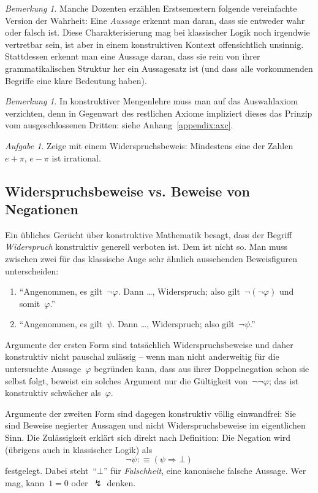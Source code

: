 \documentclass[a4paper,ngerman,12pt]{scrartcl}
\theoremstyle{definition}
\theoremstyle{plain}
\theoremstyle{remark}
\newtheorem{bem}[defn]{Bemerkung}
\newtheorem{aufg}[defn]{Aufgabe}
\renewcommand{\_}{\mathpunct{.}\,}
\newcommand{\?}{\,{:}\,}
\begin{document}
\begin{bem}Manche Dozenten erzählen Erstsemestern folgende vereinfachte Version
der Wahrheit: Eine \emph{Aussage}
erkennt man daran, dass sie entweder wahr oder falsch ist. Diese
Charakterisierung mag bei klassischer Logik noch irgendwie vertretbar sein, ist aber in
einem konstruktiven Kontext offensichtlich unsinnig. Stattdessen erkennt man
eine Aussage daran, dass sie rein von ihrer grammatikalischen Struktur her ein
Aussagesatz ist (und dass alle vorkommenden Begriffe eine klare
Bedeutung haben).\end{bem}

\begin{bem}In konstruktiver Mengenlehre muss man auf das Auswahlaxiom
verzichten, denn in Gegenwart des restlichen Axiome impliziert dieses das
Prinzip vom ausgeschlossenen Dritten: siehe Anhang~\ref{appendix:axc}.\end{bem}

\begin{aufg}Zeige mit einem Widerspruchsbeweis: Mindestens eine der Zahlen~$e +
\pi$, $e - \pi$ ist irrational.\end{aufg}


\subsection{Widerspruchsbeweise vs. Beweise von Negationen}
\label{widerspruchvsnegation}

Ein übliches Gerücht über konstruktive Mathematik besagt, dass der Begriff
\emph{Widerspruch} konstruktiv generell verboten ist. Dem ist nicht so. Man
muss zwischen zwei für das klassische Auge sehr ähnlich aussehenden
Beweisfiguren unterscheiden:
\begin{enumerate}
\item[1.] "`Angenommen, es gilt~$\neg\varphi$. Dann \ldots, Widerspruch; also
gilt~$\neg(\neg\varphi)$ und somit~$\varphi$."'
\item[2.] "`Angenommen, es gilt~$\psi$. Dann \ldots, Widerspruch; also
gilt~$\neg\psi$."'
\end{enumerate}
Argumente der ersten Form sind tatsächlich Widerspruchsbeweise und daher
konstruktiv nicht pauschal zulässig -- wenn man nicht anderweitig für die
untersuchte Aussage~$\varphi$ begründen
kann, dass aus ihrer Doppelnegation schon sie selbst folgt, beweist ein
solches Argument nur die Gültigkeit von~$\neg\neg\varphi$; das ist konstruktiv
schwächer als~$\varphi$.

Argumente der zweiten Form sind dagegen konstruktiv völlig einwandfrei: Sie
sind Beweise negierter Aussagen und nicht Widerspruchsbeweise im eigentlichen
Sinn. Die Zulässigkeit erklärt sich direkt nach Definition:
Die Negation wird (übrigens auch in klassischer Logik) als
\[ \neg\psi :\equiv (\psi \Rightarrow \bot) \]
festgelegt. Dabei steht~"`$\bot$"' für \emph{Falschheit}, eine kanonische falsche
Aussage. Wer mag, kann~$1 = 0$ oder~$\lightning$ denken.
\end{document}
